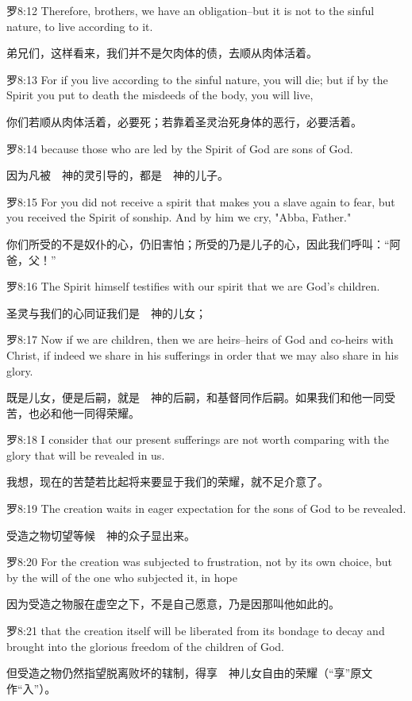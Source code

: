 \documentclass[a4paper,11pt,onecolumn,twoside]{ctexart}
\begin{document}
\begin{multicols}{2}
 罗8:12
 Therefore, brothers, we have an obligation--but it is not to the sinful nature, to live according to it.

 弟兄们，这样看来，我们并不是欠肉体的债，去顺从肉体活着。


 罗8:13
 For if you live according to the sinful nature, you will die; but if by the Spirit you put to death the misdeeds of the body, you will live,

 你们若顺从肉体活着，必要死；若靠着圣灵治死身体的恶行，必要活着。


 罗8:14
 because those who are led by the Spirit of God are sons of God.

 因为凡被　神的灵引导的，都是　神的儿子。


 罗8:15
 For you did not receive a spirit that makes you a slave again to fear, but you received the Spirit of sonship. And by him we cry, "Abba, Father."

 你们所受的不是奴仆的心，仍旧害怕；所受的乃是儿子的心，因此我们呼叫：“阿爸，父！”


 罗8:16
 The Spirit himself testifies with our spirit that we are God's children.

 圣灵与我们的心同证我们是　神的儿女；


 罗8:17
 Now if we are children, then we are heirs--heirs of God and co-heirs with Christ, if indeed we share in his sufferings in order that we may also share in his glory.

 既是儿女，便是后嗣，就是　神的后嗣，和基督同作后嗣。如果我们和他一同受苦，也必和他一同得荣耀。


 罗8:18
 I consider that our present sufferings are not worth comparing with the glory that will be revealed in us.

 我想，现在的苦楚若比起将来要显于我们的荣耀，就不足介意了。


 罗8:19
 The creation waits in eager expectation for the sons of God to be revealed.

 受造之物切望等候　神的众子显出来。


 罗8:20
 For the creation was subjected to frustration, not by its own choice, but by the will of the one who subjected it, in hope

 因为受造之物服在虚空之下，不是自己愿意，乃是因那叫他如此的。


 罗8:21
 that the creation itself will be liberated from its bondage to decay and brought into the glorious freedom of the children of God.

 但受造之物仍然指望脱离败坏的辖制，得享　神儿女自由的荣耀（“享”原文作“入”）。



\end{multicols}
\end{document}
